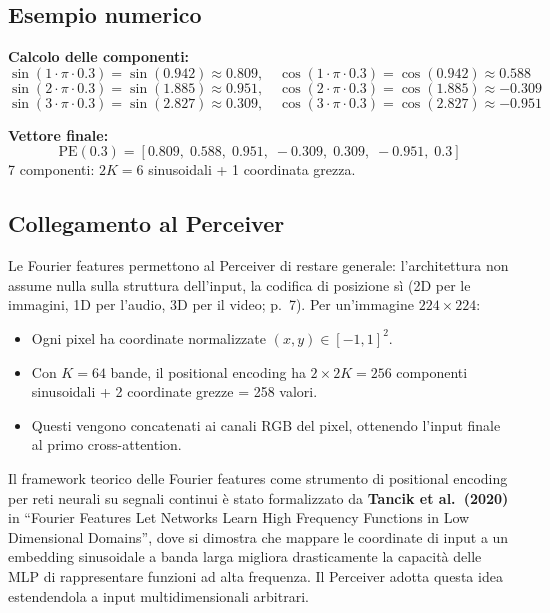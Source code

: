 \documentclass[
  11pt,
]{article}
\begin{document}
\subsection{Esempio numerico}

\begin{notabox}[title={\textbf{Esempio: $x = 0.3$, $K = 3$ bande equispaziate: $f_1=1, f_2=2, f_3=3$}}]
\textbf{Calcolo delle componenti:}
\[
\sin(1 \cdot \pi \cdot 0.3) = \sin(0.942) \approx 0.809, \quad \cos(1 \cdot \pi \cdot 0.3) = \cos(0.942) \approx 0.588
\]
\[
\sin(2 \cdot \pi \cdot 0.3) = \sin(1.885) \approx 0.951, \quad \cos(2 \cdot \pi \cdot 0.3) = \cos(1.885) \approx -0.309
\]
\[
\sin(3 \cdot \pi \cdot 0.3) = \sin(2.827) \approx 0.309, \quad \cos(3 \cdot \pi \cdot 0.3) = \cos(2.827) \approx -0.951
\]

\textbf{Vettore finale:}
\[
\text{PE}(0.3) = [0.809,\;0.588,\;0.951,\;-0.309,\;0.309,\;-0.951,\;0.3]
\]
7 componenti: $2K = 6$ sinusoidali + 1 coordinata grezza.
\end{notabox}

\subsection{Collegamento al Perceiver}

\begin{notabox}[title={\textbf{Fourier features nel Perceiver IO}}]
Le Fourier features permettono al Perceiver di restare generale: l'architettura non assume nulla sulla struttura dell'input, la codifica di posizione sì (2D per le immagini, 1D per l'audio, 3D per il video; p.~7). Per un'immagine $224 \times 224$:
\begin{itemize}
  \item Ogni pixel ha coordinate normalizzate $(x, y) \in [-1,1]^2$.
  \item Con $K=64$ bande, il positional encoding ha $2 \times 2K = 256$ componenti sinusoidali + 2 coordinate grezze = 258 valori.
  \item Questi vengono concatenati ai canali RGB del pixel, ottenendo l'input finale al primo cross-attention.
\end{itemize}
Il framework teorico delle Fourier features come strumento di positional encoding per reti neurali su segnali continui è stato formalizzato da \textbf{Tancik et al.\ (2020)} in ``Fourier Features Let Networks Learn High Frequency Functions in Low Dimensional Domains'', dove si dimostra che mappare le coordinate di input a un embedding sinusoidale a banda larga migliora drasticamente la capacità delle MLP di rappresentare funzioni ad alta frequenza. Il Perceiver adotta questa idea estendendola a input multidimensionali arbitrari.
\end{notabox}
\end{document}
